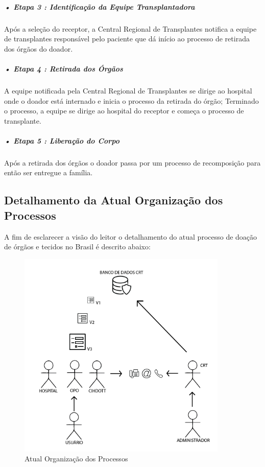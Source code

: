 \documentclass[portuguese,oneside]{tcc}
\begin{document}
\subparagraph{• Etapa 3 : Identificação da Equipe Transplantadora}
Após a seleção do receptor, a Central Regional de Transplantes notifica a equipe de transplantes responsável pelo paciente que dá início ao processo de retirada dos órgãos do doador.

\subparagraph{• Etapa 4 : Retirada dos Órgãos}
A equipe notificada pela Central Regional de Transplantes se dirige ao hospital onde o doador está internado e inicia o processo da retirada do órgão; Terminado o processo, a equipe se dirige ao hospital do receptor e começa o processo de transplante.

\subparagraph{• Etapa 5 : Liberação do Corpo}
Após a retirada dos órgãos o doador passa por um processo de recomposição para então ser entregue a família.


\subsection{Detalhamento da Atual Organização dos Processos}  \label{tab:detalhamento-atual}
A fim de esclarecer a visão do leitor o detalhamento do atual processo de doação de órgãos e tecidos no Brasil é descrito abaixo:

\begin{figure}[htp]
\centering
\caption{Atual Organização dos Processos}
\includegraphics[width=10cm]{processo-rudimentar}

\label{fig:processo-rudimentar}
\end{figure}
\end{document}
